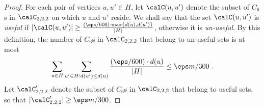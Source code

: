 \begin{proof}
For each pair of vertices $u,u' \in H$, let $\calC(u,u')$ denote the subset of $C_6$s in $\calC_{2,2,2}$ on which $u$ and $u'$ reside. 
We shall say that the set $\calC(u,u')$ is \emph{useful} if 
$|\calC(u,u')| \geq \frac{(\eps/600)\cdot \max\{d(u),d(u')\}}{|H|}$, otherwise it is \emph{un-useful}.
By this definition, the number of  $C_6$s 
in $\calC_{2,2,2}$ that belong to un-useful sets is at most 
\begin{equation}
    \sum_{u\in H}\sum_{u'\in H:d(u')\leq d(u)}\frac{(\eps/600)\cdot d(u)}{|H|}\leq 
    \eps m/300 \;.
\end{equation}
Let $\calC'_{2,2,2}$ denote the subset of $C_6$s in $\calC_{2,2,2}$ that belong to useful sets, so that
$|\calC'_{2,2,2}| \geq \eps m/300$.


\end{proof}
